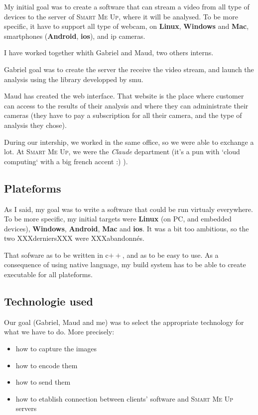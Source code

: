 \documentclass[a4paper,11pt]{custom}
\newcommand{\smu}{\textsc{Smart Me Up}}
\newcommand{\linux}{\textbf{Linux}}
\newcommand{\win}{\textbf{Windows}}
\newcommand{\mac}{\textbf{Mac}}
\newcommand{\android}{\textbf{Android}}
\newcommand{\ios}{\textbf{ios}}
\newcommand{\claude}{\textit{Claude}}
\newcommand{\cpp}{c$++$}
\begin{document}
My initial goal was to create a software that can stream a video from all type of
devices to the server of \smu, where it will be analysed. To be more specific,
it have to support all type of webcam, on \linux, \win{} and \mac, smartphones
(\android, \ios), and ip cameras.

I have worked together whith Gabriel and Maud, two others interns.

Gabriel goal was to create the server the receive the video stream, and launch
the analysis using the library developped by smu.

Maud has created the web interface. That website is the place where customer can
access to the results of their analysis and where they can administrate their
cameras (they have to pay a subscription for all their camera, and the type of
analysis they chose).

During our intership, we worked in the same office, so we were able to exchange
a lot. At \smu, we were the \claude{} department (it's a pun with `cloud
computing` with a big french accent :) ).

\subsection{Plateforms}

As I said, my goal was to write a software that could be run virtualy
everywhere. To be more specific, my initial targets were \linux{} (on PC, and
embedded devices), \win, \android, \mac{} and \ios. It was a bit too ambitious, so
the two XXXderniersXXX were XXXabandonnés.

That sofware as to be written in \cpp, and as to be easy to use. As a
consequence of using native language, my build system has to be able to create
executable for all plateforms.

\subsection{Technologie used}

Our goal (Gabriel, Maud and me) was to select the appropriate technology for
what we have to do. More precisely:
\begin{itemize}
\item how to capture the images
\item how to encode them
\item how to send them
\item how to etablish connection between clients' software and \smu{} servers
\end{itemize}
\end{document}
